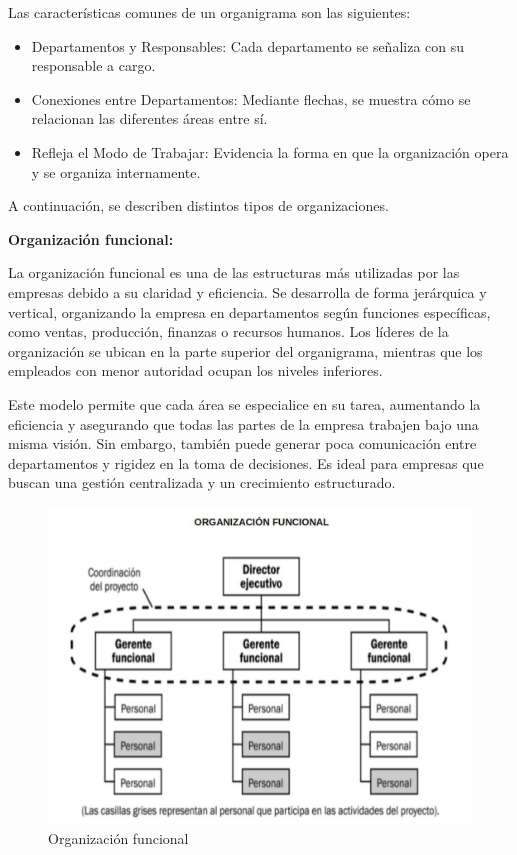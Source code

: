 \documentclass[a4paper,oneside,11pt]{article}
\begin{document}
Las características comunes de un organigrama son las siguientes:

\begin{itemize}
    \item Departamentos y Responsables: Cada departamento se señaliza con su responsable a cargo.
    \item Conexiones entre Departamentos: Mediante flechas, se muestra cómo se relacionan las diferentes áreas entre sí.
    \item Refleja el Modo de Trabajar: Evidencia la forma en que la organización opera y se organiza internamente.
\end{itemize}

A continuación, se describen distintos tipos de organizaciones.

\textbf{Organización funcional:}

La organización funcional es una de las estructuras más utilizadas por las empresas debido a su claridad y eficiencia. Se desarrolla de forma jerárquica y vertical, organizando la empresa en departamentos según funciones específicas, como ventas, producción, finanzas o recursos humanos. Los líderes de la organización se ubican en la parte superior del organigrama, mientras que los empleados con menor autoridad ocupan los niveles inferiores.

Este modelo permite que cada área se especialice en su tarea, aumentando la eficiencia y asegurando que todas las partes de la empresa trabajen bajo una misma visión. Sin embargo, también puede generar poca comunicación entre departamentos y rigidez en la toma de decisiones. Es ideal para empresas que buscan una gestión centralizada y un crecimiento estructurado.

\begin{figure} [ht!]
    \centering
    \includegraphics[scale=0.5]{org_funcional.jpg}
    \caption{Organización funcional}
\end{figure}
\end{document}

